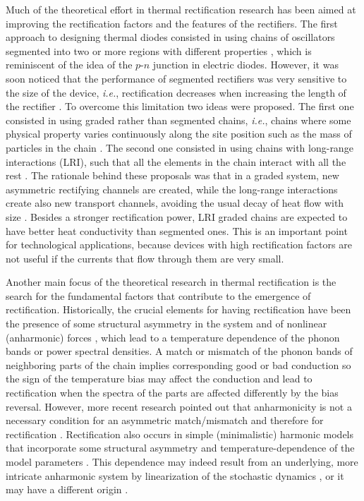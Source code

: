 Much of the theoretical effort in thermal rectification research has been aimed at improving the rectification factors and the features of the rectifiers. The first approach to designing thermal diodes consisted in using chains of oscillators segmented into two or more regions with different properties \cite{Terraneo2002,Li2004,Li2008,Hu2006}, which is reminiscent of the idea of the $p$-$n$ junction in electric diodes. However, it was soon noticed that the performance of segmented rectifiers was very sensitive to the size of the device, \textit{i.e.}, rectification decreases when increasing the length of the rectifier \cite{Hu2006}. To overcome this limitation two ideas were proposed. The first one consisted in using graded rather than segmented chains, \textit{i.e.}, chains where some physical property varies continuously along the site position such as the mass of particles in the chain \cite{Wang2012,Chen2015,Romero-Bastida2017,Yang2007,Romero-Bastida2013,Dettori2016,Pereira2010,Pereira2011,Avila2013}. The second one consisted in using chains with long-range interactions (LRI), such that all the elements in the chain interact with all the rest \cite{Chen2015,Bagchi2017,Pereira2013}. The rationale behind these proposals was that in a graded system, new asymmetric rectifying channels are created, while the long-range interactions create
also new transport channels, avoiding the usual decay of heat flow with size \cite{Chen2015}. Besides a stronger rectification power, LRI graded chains are expected to have better heat conductivity than segmented ones. This is an important point for technological applications, because devices with high rectification factors are not useful if the currents that flow through them are very small.

Another main focus of the theoretical research in thermal rectification is the search for the fundamental factors that contribute to the emergence of rectification. Historically, the crucial elements for having rectification have been the presence of some structural asymmetry in the system and of nonlinear (anharmonic) forces \cite{Zeng2008,Katz2016,Li2008,Hu2006,Benenti2016,Li2012,Segal2005,Segal2005b}, which lead to a temperature dependence of the phonon bands or power spectral densities. A match or mismatch of the phonon bands of neighboring parts of the chain implies corresponding good or bad conduction so the
sign of the temperature bias may affect the conduction and lead to rectification when the spectra of the parts are affected differently by the bias reversal. However, more recent research pointed out that anharmonicity is not a necessary condition for an asymmetric match/mismatch and therefore for rectification \cite{Pereira2017}. Rectification also occurs in simple (minimalistic) harmonic models that incorporate some structural asymmetry and temperature-dependence of the model parameters \cite{Pereira2017}. This dependence may indeed result from an underlying, more intricate  anharmonic system by linearization of the stochastic dynamics \cite{Pereira2017,Pereira2019}, or it may have a different origin \cite{Simon2019}.


